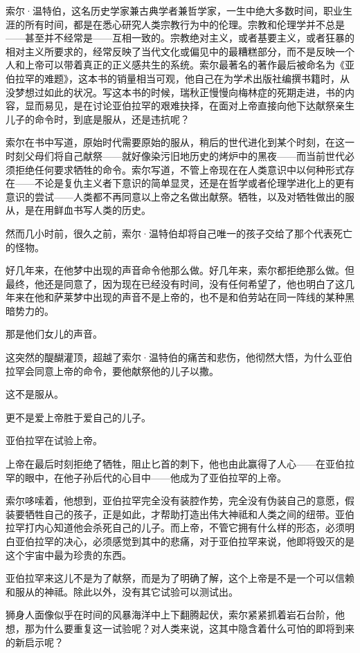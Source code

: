 \documentclass[AutoFakeBold=true]{book}
\begin{document}
索尔·温特伯，这名历史学家兼古典学者兼哲学家，一生中绝大多数时间，职业生涯的所有时间，都是在悉心研究人类宗教行为中的伦理。宗教和伦理学并不总是——甚至并不经常是——互相一致的。宗教绝对主义，或者基要主义，或者狂暴的相对主义所要求的，经常反映了当代文化或偏见中的最糟糕部分，而不是反映一个人和上帝可以带着真正的正义感共生的系统。索尔最著名的著作最后被命名为《亚伯拉罕的难题》，这本书的销量相当可观，他自己在为学术出版社编撰书籍时，从没梦想过如此的状况。写这本书的时候，瑞秋正慢慢向梅林症的死期走进，书的内容，显而易见，是在讨论亚伯拉罕的艰难抉择，在面对上帝直接向他下达献祭亲生儿子的命令时，到底是服从，还是违抗呢？

索尔在书中写道，原始时代需要原始的服从，稍后的世代进化到某个时刻，在这一时刻父母们将自己献祭——就好像染污旧地历史的烤炉中的黑夜——而当前世代必须拒绝任何要求牺牲的命令。索尔写道，不管上帝现在在人类意识中以何种形式存在——不论是复仇主义者下意识的简单显灵，还是在哲学或者伦理学进化上的更有意识的尝试——人类都不再同意以上帝之名做出献祭。牺牲，以及对牺牲做出的服从，是在用鲜血书写人类的历史。

然而几小时前，很久之前，索尔·温特伯却将自己唯一的孩子交给了那个代表死亡的怪物。

好几年来，在他梦中出现的声音命令他那么做。好几年来，索尔都拒绝那么做。但最终，他还是同意了，因为现在已经没有时间，没有任何希望了，他也明白了这几年来在他和萨莱梦中出现的声音不是上帝的，也不是和伯劳站在同一阵线的某种黑暗势力的。

那是他们女儿的声音。

这突然的醍醐灌顶，超越了索尔·温特伯的痛苦和悲伤，他彻然大悟，为什么亚伯拉罕会同意上帝的命令，要他献祭他的儿子以撒。

这不是服从。

更不是爱上帝胜于爱自己的儿子。

{\kaishu 亚伯拉罕在试验上帝。}

上帝在最后时刻拒绝了牺牲，阻止匕首的刺下，他也由此赢得了人心——在亚伯拉罕的眼中，在他子孙后代的心目中——他成为了亚伯拉罕的上帝。

索尔哆嗦着，他想到，亚伯拉罕完全没有装腔作势，完全没有伪装自己的意愿，假装要牺牲自己的孩子，正是如此，才帮助打造出伟大神祗和人类之间的纽带。亚伯拉罕打内心知道他会杀死自己的儿子。而上帝，不管它拥有什么样的形态，必须明白亚伯拉罕的决心，必须感觉到其中的悲痛，对于亚伯拉罕来说，他即将毁灭的是这个宇宙中最为珍贵的东西。

亚伯拉罕来这儿不是为了献祭，而是为了明确了解，这个上帝是不是一个可以信赖和服从的神祗。除此以外，没有其它试验可以测试出。

狮身人面像似乎在时间的风暴海洋中上下翻腾起伏，索尔紧紧抓着岩石台阶，他想，那为什么要重复这一试验呢？对人类来说，这其中隐含着什么可怕的即将到来的新启示呢？
\end{document}
